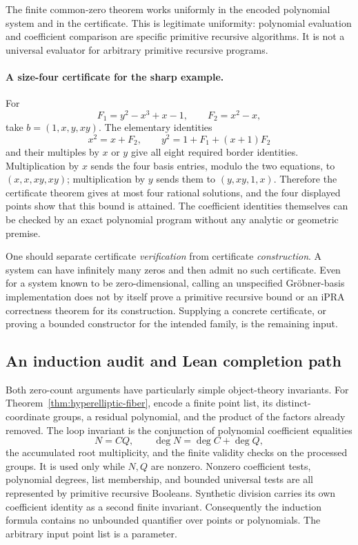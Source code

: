 The finite common-zero theorem works uniformly in the encoded polynomial
system and in the certificate.  This is legitimate uniformity: polynomial
evaluation and coefficient comparison are specific primitive recursive
algorithms.  It is not a universal evaluator for arbitrary primitive
recursive programs.

\paragraph{A size-four certificate for the sharp example.}
For
\[
 F_1=y^2-x^3+x-1,\qquad F_2=x^2-x,
\]
take $b=(1,x,y,xy)$.  The elementary identities
\[
        x^2=x+F_2,\qquad
        y^2=1+F_1+(x+1)F_2
\]
and their multiples by $x$ or $y$ give all eight required border
identities.  Multiplication by $x$ sends the four basis entries, modulo
the two equations, to $(x,x,xy,xy)$; multiplication by $y$ sends them
to $(y,xy,1,x)$.  Therefore the certificate theorem gives at most four
rational solutions, and the four displayed points show that this bound
is attained.  The coefficient identities themselves can be checked by
an exact polynomial program without any analytic or geometric premise.

One should separate certificate \emph{verification} from certificate
\emph{construction}.  A system can have infinitely many zeros and then
admit no such certificate.  Even for a system known to be zero-dimensional,
calling an unspecified Gr\"obner-basis implementation does not by itself
prove a primitive recursive bound or an iPRA correctness theorem for its
construction.  Supplying a concrete certificate, or proving a bounded
constructor for the intended family, is the remaining input.

\subsection{An induction audit and Lean completion path}

Both zero-count arguments have particularly simple object-theory
invariants.  For Theorem~\ref{thm:hyperelliptic-fiber}, encode a finite
point list, its distinct-coordinate groups, a residual polynomial, and
the product of the factors already removed.  The loop invariant is the
conjunction of polynomial coefficient equalities
\[
 N=CQ,\qquad
 \deg N=\deg C+\deg Q,
\]
the accumulated root multiplicity, and the finite validity checks on the
processed groups.  It is used only while $N,Q$ are nonzero.  Nonzero
coefficient tests, polynomial degrees, list membership, and bounded
universal tests are all represented by primitive recursive Booleans.
Synthetic division carries its own coefficient identity as a second
finite invariant.  Consequently the induction formula contains no
unbounded quantifier over points or polynomials.  The arbitrary input
point list is a parameter.

